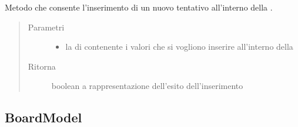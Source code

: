 \documentclass[letterpaper,10pt,italian,openany,oneside]{sphinxmanual}
\begin{document}
\begin{fulllineitems}
\label{\detokenize{test/it/unicam/cs/pa/mastermind/gamecore/BoardController:it.unicam.cs.pa.mastermind.gamecore.BoardController.insertNewAttempt(List)}}
Metodo che consente l’inserimento di un nuovo tentativo all’interno della .
\begin{quote}\begin{description}
\item[{Parametri}] \leavevmode\begin{itemize}
\item {} 
 \textendash{} la  di  contenente i valori che si vogliono inserire all’interno della 

\end{itemize}

\item[{Ritorna}] \leavevmode
boolean a rappresentazione dell’esito dell’inserimento

\end{description}\end{quote}

\end{fulllineitems}



\subsection{BoardModel}
\label{\detokenize{test/it/unicam/cs/pa/mastermind/gamecore/BoardModel:boardmodel}}\label{\detokenize{test/it/unicam/cs/pa/mastermind/gamecore/BoardModel::doc}}
\end{document}
